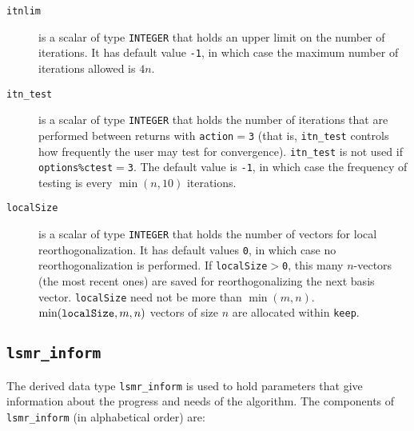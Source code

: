 \begin{description}
   \item[\texttt{itnlim}] is a scalar of
      type {\tt INTEGER} that holds an upper limit on the number of iterations.
      It has default value {\tt -1}, in which case the 
      maximum number of iterations allowed is $4n$. 

   \item[\texttt{itn\_test}] is a scalar of
      type {\tt INTEGER} that holds the number of iterations that are performed
      between returns with {\tt action}$ = ${\tt 3} (that is, {\tt itn\_test}
      controls how frequently the user may test for convergence).
      {\tt itn\_test} is not used if {\tt options\%ctest}$=${\tt 3}.
      The default value is {\tt -1}, in which case the frequency of testing is 
      every $\min(n,10)$ iterations.

   \item[\texttt{localSize}] is a scalar of type {\tt INTEGER} that holds the
      number of vectors for local reorthogonalization. It has default values
      {\tt 0}, in which case no reorthogonalization is performed.
      If {\tt localSize}$>${\tt0}, this many $n$-vectors  (the most recent ones)
      are saved for reorthogonalizing the next basis vector. {\tt localSize}
      need not be more than $\min(m,n)$. $\min({\tt localSize},m,n)$ vectors of
      size $n$ are allocated within {\tt keep}.
\end{description}


\subsection{\texttt{lsmr\_inform}}
\label{LSMR:type:inform}
The derived data type {\tt lsmr\_inform}
is used to hold parameters that give information about the progress and needs
of the algorithm. The components of {\tt lsmr\_inform}
(in alphabetical order) are:

